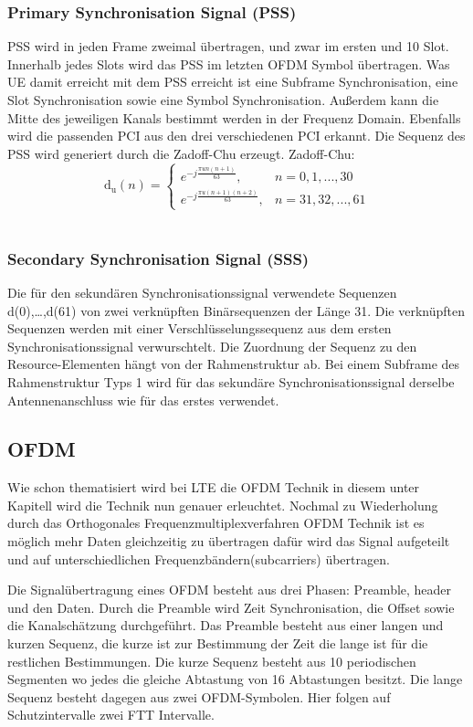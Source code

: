 \subsubsection{Primary Synchronisation Signal (PSS)}
 PSS wird in jeden Frame zweimal übertragen, und zwar im ersten und 10 Slot. Innerhalb jedes Slots wird das PSS im letzten OFDM Symbol übertragen. Was UE damit erreicht mit dem PSS erreicht ist eine Subframe Synchronisation, eine Slot Synchronisation sowie eine Symbol Synchronisation. Außerdem kann die Mitte des jeweiligen Kanals bestimmt werden in der Frequenz Domain. Ebenfalls wird die passenden PCI aus den drei verschiedenen PCI erkannt.
 Die Sequenz des PSS wird generiert durch die Zadoff-Chu erzeugt. Zadoff-Chu: $$ 	\operatorname{d_u}(n)=\begin{cases} e^{-j\frac{\pi un(n+1)}{63}}, & n=0,1,...,30 \\ e^{-j\frac{\pi u(n+1)(n+2)}{63}}, & n=31,32,...,61 \end{cases}$$~\cite[S.~181]{etsi2021136} 
\subsubsection{Secondary Synchronisation Signal (SSS)}
Die für den sekundären Synchronisationssignal verwendete Sequenzen d(0),…,d(61) von zwei verknüpften Binärsequenzen der Länge 31. Die verknüpften Sequenzen werden mit einer Verschlüsselungssequenz aus dem ersten Synchronisationssignal verwurschtelt. Die Zuordnung der Sequenz zu den Resource-Elementen hängt von der Rahmenstruktur ab. Bei einem Subframe des Rahmenstruktur Typs 1 wird für das sekundäre Synchronisationssignal derselbe Antennenanschluss wie für das erstes verwendet. ~\cite[S.~183]{etsi2021136} 

\subsection{OFDM}
Wie schon thematisiert wird bei LTE die OFDM Technik in diesem unter Kapitell wird die Technik nun genauer erleuchtet. Nochmal zu Wiederholung durch das Orthogonales Frequenzmultiplexverfahren OFDM Technik ist es möglich mehr Daten gleichzeitig zu übertragen dafür wird das Signal aufgeteilt und auf unterschiedlichen Frequenzbändern(subcarriers) übertragen.

Die Signalübertragung eines OFDM besteht aus drei Phasen: Preamble, header und den Daten. Durch die Preamble wird Zeit Synchronisation, die Offset sowie die Kanalschätzung durchgeführt. Das Preamble besteht aus einer langen und kurzen Sequenz, die kurze ist zur Bestimmung der Zeit die lange ist für die restlichen Bestimmungen. Die kurze Sequenz besteht aus 10 periodischen Segmenten wo jedes die gleiche Abtastung von 16 Abtastungen besitzt. Die lange Sequenz besteht dagegen aus zwei OFDM-Symbolen. Hier folgen auf Schutzintervalle zwei FTT Intervalle.

